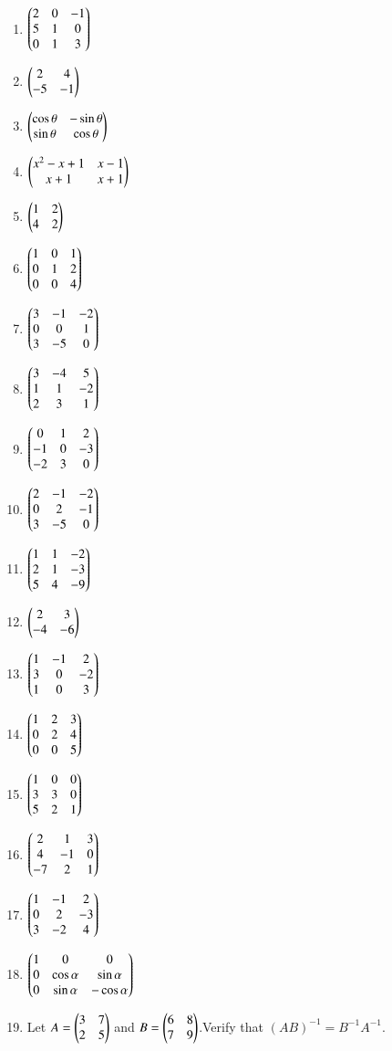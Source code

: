\begin{enumerate}[label=\thesubsection.\arabic*,ref=\thesubsection.\theenumi]
\item $\begin{pmatrix}2 & 0 & -1 \\ 5 & 1 & 0 \\ 0 & 1 & 3\end{pmatrix}$ 
\item $\begin{pmatrix}2 & 4 \\ -5 & -1\end{pmatrix}$ 
\item $\begin{pmatrix}\cos \theta  &  -\sin \theta \\ \sin \theta & \cos \theta\end{pmatrix}$
\item $\begin{pmatrix}x^2-x+1 & x-1 \\ x+1 & x+1\end{pmatrix}$ 
\item $\begin{pmatrix}1 & 2 \\ 4 & 2\end{pmatrix}$
\item $\begin{pmatrix}1 & 0 & 1 \\ 0 & 1 & 2 \\ 0 & 0 & 4\end{pmatrix}$
\item $\begin{pmatrix}3 & -1 & -2 \\ 0 & 0 & 1 \\ 3 & -5 & 0\end{pmatrix}$
\item $\begin{pmatrix}3 & -4 & 5 \\ 1 & 1 & -2 \\ 2 & 3 & 1\end{pmatrix}$
\item $\begin{pmatrix}0 & 1 & 2 \\ -1 & 0 & -3 \\ -2 & 3 & 0\end{pmatrix}$
\item $\begin{pmatrix}2 & -1 & -2 \\ 0 & 2 & -1 \\ 3 & -5 & 0\end{pmatrix}$
\item $\begin{pmatrix}1 & 1 & -2 \\ 2 & 1 & -3 \\ 5 & 4 & -9\end{pmatrix}$
\item $\begin{pmatrix}2 & 3 \\ -4 & -6\end{pmatrix}$ \label{prob:3}
\item $\begin{pmatrix}1 & -1 & 2 \\ 3 & 0 & -2 \\ 1 & 0 & 3\end{pmatrix}$ \label{prob:4}
\item $\begin{pmatrix}1 & 2 & 3 \\ 0 & 2 & 4 \\ 0 & 0 & 5\end{pmatrix}$
\item $\begin{pmatrix}1 & 0 & 0 \\ 3 & 3 & 0 \\ 5 & 2 & 1\end{pmatrix}$
\item $\begin{pmatrix}2 & 1 & 3 \\ 4 & -1 & 0 \\ -7 & 2 & 1\end{pmatrix}$
\item $\begin{pmatrix}1 & -1 & 2 \\ 0 & 2 & -3 \\ 3 & -2 & 4\end{pmatrix}$
\item $\begin{pmatrix}1 & 0 & 0 \\ 0 & \cos \alpha & \sin \alpha \\ 0 & \sin \alpha & -\cos \alpha\end{pmatrix}$ \label{prob:11}
\item Let $A=\begin{pmatrix}3 & 7 \\ 2 & 5\end{pmatrix}$ and $B=\begin{pmatrix}6 & 8 \\ 7 & 9\end{pmatrix}$.Verify that $(AB)^{-1}=B^{-1} A^{-1}$.
\end{enumerate}
